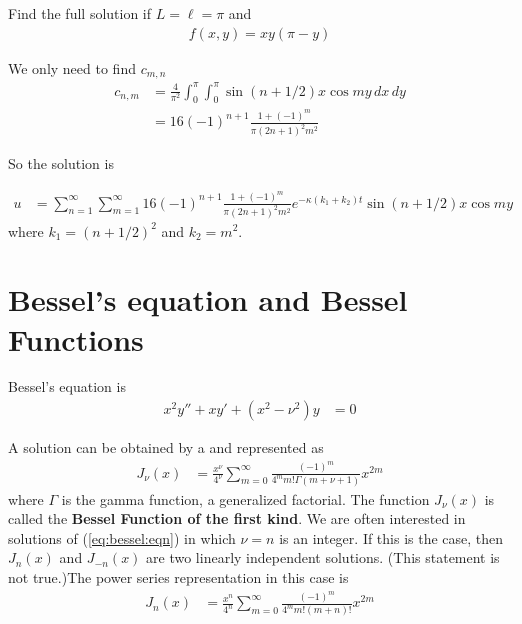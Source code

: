 \begin{example}
Find the full solution if $L=\ell=\pi$ and 
%
\begin{align*}
f(x,y) = x y (\pi-y)  
\end{align*}

\solution

We only need to find $c_{m,n}$ 
%
\begin{align*}
c_{n,m} & =\frac{4}{\pi^2} \int_0^{\pi}\int_0^{\pi} \sin (n+1/2) x \cos my  \, dx \, dy\\
& = 16 (-1)^{n+1} {\frac {1+(-1)^m}{{\pi } (2n+1)^2 {m}^{2}}} 
\end{align*}

So the solution is

\begin{align*}
u & = \sum_{n=1}^{\infty} \sum_{m=1}^{\infty} 16 (-1)^{n+1} {\frac {1+(-1)^m}{{\pi } (2n+1)^2 {m}^{2}}}    e^{-\kappa(k_1+k_2)t}\sin (n+1/2)  x\cos my 
\end{align*}
where
$k_1= (n+1/2)^2$ and $k_2=m^2$.  
\end{example}


\section{Bessel's equation and Bessel Functions}

\label{sect:bessel:functions}

Bessel's equation is 
% 
\begin{align} \label{eq:bessel:eqn}
x^2 y'' + x y' + (x^2-\nu^2)y & = 0 
\end{align}

A solution can be obtained by a  and represented as 
%
\begin{align*}
J_{\nu} (x) & = \frac{x^{\nu}}{4^{\nu}} \sum_{m=0}^{\infty} \frac{(-1)^m}{4^m m! \Gamma(m+\nu+1)} x^{2m} 
\end{align*}
where $\Gamma$ is the gamma function, a generalized factorial.   The function $J_{\nu}(x)$ is called the \textbf{Bessel Function of the first kind}.    We are often interested in solutions of (\ref{eq:bessel:eqn}) in which $\nu=n$ is an integer.  {\color{red} If this is the case, then $J_n(x)$ and $J_{-n}(x)$ are two linearly independent solutions.  (This statement is not true.)}The power series representation in this case is
%
\begin{align} \label{eq:bessel:function:power:series}
J_{n} (x) & = \frac{x^{n}}{4^{n}} \sum_{m=0}^{\infty} \frac{(-1)^m}{4^m m! (m+n)!} x^{2m} 
\end{align}

